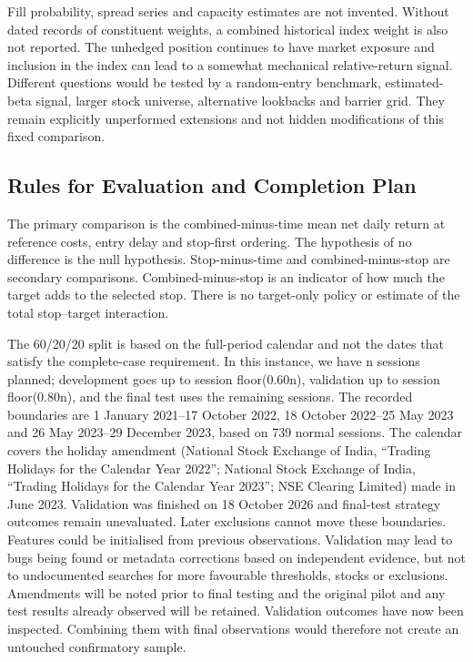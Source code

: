 \documentclass[11pt,a4paper]{article}
\begin{document}
Fill probability, spread series and capacity estimates are not invented. Without dated records of constituent weights, a combined historical index weight is also not reported. The unhedged position continues to have market exposure and inclusion in the index can lead to a somewhat mechanical relative-return signal. Different questions would be tested by a random-entry benchmark, estimated-beta signal, larger stock universe, alternative lookbacks and barrier grid. They remain explicitly unperformed extensions and not hidden modifications of this fixed comparison.

\subsection*{Rules for Evaluation and Completion Plan}

The primary comparison is the combined-minus-time mean net daily return at reference costs, entry delay and stop-first ordering. The hypothesis of no difference is the null hypothesis. Stop-minus-time and combined-minus-stop are secondary comparisons. Combined-minus-stop is an indicator of how much the target adds to the selected stop. There is no target-only policy or estimate of the total stop--target interaction.

The 60/20/20 split is based on the full-period calendar and not the dates that satisfy the complete-case requirement. In this instance, we have n sessions planned; development goes up to session floor(0.60n), validation up to session floor(0.80n), and the final test uses the remaining sessions. The recorded boundaries are 1 January 2021--17 October 2022, 18 October 2022--25 May 2023 and 26 May 2023--29 December 2023, based on 739 normal sessions. The calendar covers the holiday amendment (National Stock Exchange of India, “Trading Holidays for the Calendar Year 2022”; National Stock Exchange of India, “Trading Holidays for the Calendar Year 2023”; NSE Clearing Limited) made in June 2023. Validation was finished on 18 October 2026 and final-test strategy outcomes remain unevaluated. Later exclusions cannot move these boundaries. Features could be initialised from previous observations. Validation may lead to bugs being found or metadata corrections based on independent evidence, but not to undocumented searches for more favourable thresholds, stocks or exclusions. Amendments will be noted prior to final testing and the original pilot and any test results already observed will be retained. Validation outcomes have now been inspected. Combining them with final observations would therefore not create an untouched confirmatory sample.
\end{document}
